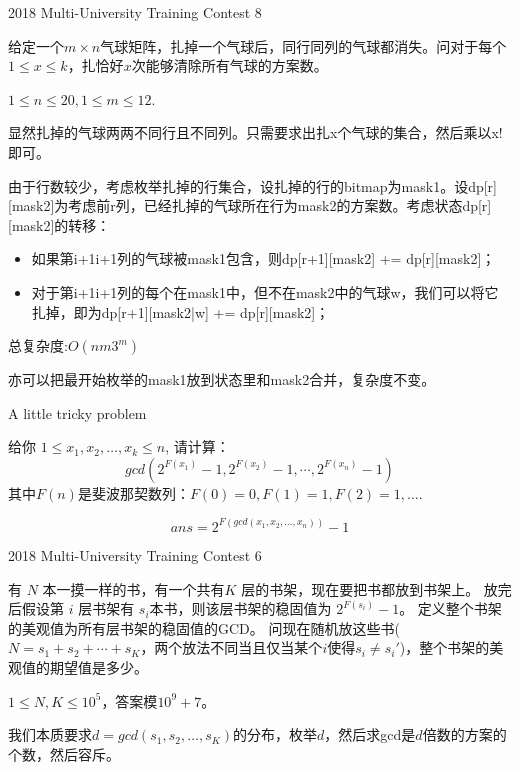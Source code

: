 \documentclass[11pt,serif]{beamer}
\begin{document}
	\begin{frame}{2018 Multi-University Training Contest 8} 
		\begin{problem}
			给定一个$m\times n$气球矩阵，扎掉一个气球后，同行同列的气球都消失。问对于每个$1 \leq x \leq k$，扎恰好$x$次能够清除所有气球的方案数。
			
			$1 \leq n \leq 20, 1 \leq m \leq 12$.
		\end{problem}
	\end{frame}
	\begin{frame} 
		\begin{solution}
			显然扎掉的气球两两不同行且不同列。只需要求出扎x个气球的集合，然后乘以x!即可。
			
			由于行数较少，考虑枚举扎掉的行集合，设扎掉的行的bitmap为mask1。设dp[r][mask2]为考虑前r列，已经扎掉的气球所在行为mask2的方案数。考虑状态dp[r][mask2]的转移：
			\begin{itemize}
				\item 如果第i+1i+1列的气球被mask1包含，则dp[r+1][mask2] += dp[r][mask2]；
				\item 对于第i+1i+1列的每个在mask1中，但不在mask2中的气球w，我们可以将它扎掉，即为dp[r+1][mask2|w] += dp[r][mask2]；
			\end{itemize}
			总复杂度:$O(nm3^m)$
			
			亦可以把最开始枚举的mask1放到状态里和mask2合并，复杂度不变。
		\end{solution}
	\end{frame}

	\begin{frame}{A little tricky problem}
		\begin{problem}
			给你 $1 \leq x_1, x_2, \dots, x_k \leq n$, 请计算：
			$$
				gcd(2^{F(x_1)}-1, 2^{F(x_2)}-1, \cdots, 2^{F(x_n)}-1)
			$$
			其中$F(n)$是斐波那契数列：$F(0) = 0, F(1) = 1, F(2) = 1, \dots$.
		\end{problem}
		\pause
		\begin{solution}
			$$
				ans = 2^{F(gcd(x_1,x_2,\dots,x_n))}-1
			$$
		\end{solution}
	\end{frame}

	\begin{frame}{2018 Multi-University Training Contest 6}
		\begin{problem}[bookshelf]
			有 $N$ 本一摸一样的书，有一个共有$K$ 层的书架，现在要把书都放到书架上。
			放完后假设第 $i$ 层书架有 $s_i$本书，则该层书架的稳固值为 $2^{F(s_i)}-1$。
			定义整个书架的美观值为所有层书架的稳固值的GCD。
			问现在随机放这些书($N=s_1+s_2+\cdots+s_K$，两个放法不同当且仅当某个$i$使得$s_i \neq s_i'$)，整个书架的美观值的期望值是多少。
			
			$1 \leq N, K \leq 10^5$，答案模$10^9+7$。
		\end{problem}
		\pause
		\begin{solution}
			我们本质要求$d = gcd(s_1,s_2,\dots,s_K)$的分布，枚举$d$，然后求gcd是$d$倍数的方案的个数，然后容斥。
		\end{solution}
	\end{frame}
\end{document}
